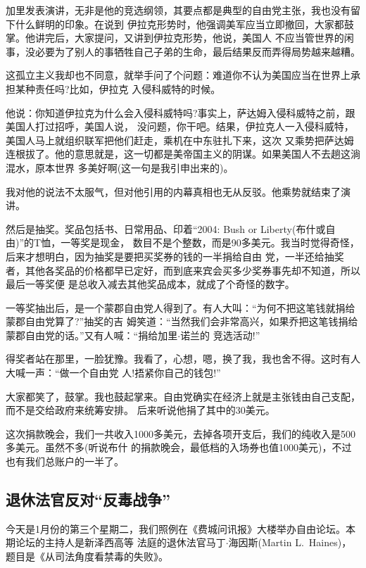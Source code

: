 ﻿\documentclass[11pt]{article}
\begin{document}
加里发表演讲，无非是他的竞选纲领，其要点都是典型的自由党主张，我也没有留下什么鲜明的印象。在说到
伊拉克形势时，他强调美军应当立即撤回，大家都鼓掌。他讲完后，大家提问，又讲到伊拉克形势，他说，美国人
不应当管世界的闲事，没必要为了别人的事牺牲自己子弟的生命，最后结果反而弄得局势越来越糟。

这孤立主义我却也不同意，就举手问了个问题：难道你不认为美国应当在世界上承担某种责任吗?比如，伊拉克
入侵科威特的时候。

他说：你知道伊拉克为什么会入侵科威特吗?事实上，萨达姆入侵科威特之前，跟美国人打过招呼，美国人说，
没问题，你干吧。结果，伊拉克人一入侵科威特，美国人马上就组织联军把他们赶走，乘机在中东驻扎下来，这次
又乘势把萨达姆连根拔了。他的意思就是，这一切都是美帝国主义的阴谋。如果美国人不去趟这淌混水，原本世界
多美好啊(这一句是我引申出来的)。

我对他的说法不太服气，但对他引用的内幕真相也无从反驳。他乘势就结束了演讲。

然后是抽奖。奖品包括书、日常用品、印着``2004: Bush or Liberty(布什或自由)''的T恤，一等奖是现金，
数目不是个整数，而是90多美元。我当时觉得奇怪，后来才想明白，因为抽奖是要把买奖券的钱的一半捐给自由
党，一半还给抽奖者，其他各奖品的价格都早已定好，而到底来宾会买多少奖券事先却不知道，所以最后一等奖便
是总收入减去其他奖品成本，就成了个奇怪的数字。

一等奖抽出后，是一个蒙郡自由党人得到了。有人大叫：``为何不把这笔钱就捐给蒙郡自由党算了?''抽奖的吉
姆笑道：``当然我们会非常高兴，如果乔把这笔钱捐给蒙郡自由党的话。''又有人喊：``捐给加里$\cdot$诺兰的
竞选活动!''

得奖者站在那里，一脸犹豫。我看了，心想，嗯，换了我，我也舍不得。这时有人大喊一声：``做一个自由党
人!捂紧你自己的钱包!''

大家都笑了，鼓掌。我也鼓起掌来。自由党确实在经济上就是主张钱由自己支配，而不是交给政府来统筹安排。
后来听说他捐了其中的30美元。

这次捐款晚会，我们一共收入1000多美元，去掉各项开支后，我们的纯收入是500多美元。虽然不多(听说布什
的捐款晚会，最低档的入场券也值1000美元)，不过也有我们总账户的一半了。

\subsection{退休法官反对``反毒战争''}

今天是1月份的第三个星期二，我们照例在《费城问讯报》大楼举办自由论坛。本期论坛的主持人是新泽西高等
法庭的退休法官马丁$\cdot$海因斯(Martin L.~Haines)，题目是《从司法角度看禁毒的失败》。
\end{document}
